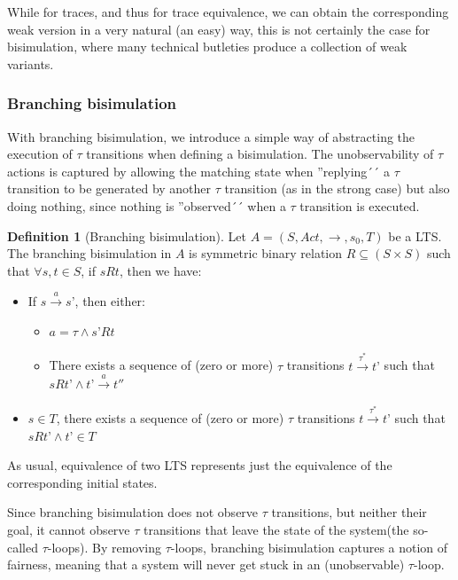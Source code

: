 \documentclass[11pt]{article}
\theoremstyle{definition}
\newtheorem{definition}{Definition}
\theoremstyle{plain}
\theoremstyle{definition}
\begin{document}
While for traces, and thus for trace equivalence, we can obtain the corresponding weak version in a very natural (an easy) way, this is not certainly the case for bisimulation, where many technical butleties produce a collection of weak variants.

\subsubsection{Branching bisimulation}
With branching bisimulation, we introduce a simple way of abstracting the execution of $ \tau $ transitions when defining a bisimulation. The unobservability of  $ \tau $ actions is captured by allowing the matching state when ''replying´´ a $ \tau $ transition to be generated by another $ \tau $ transition (as in the strong case) but also doing nothing, since nothing is ''observed´´ when a $ \tau $ transition is executed.

\begin{definition} [Branching bisimulation]
	Let $ A = (S, Act, \rightarrow, s_0, T) $ be a LTS. The branching bisimulation in $ A $ is symmetric binary relation $ R  \subseteq (S\times S) $ such that $\forall s, t \in S$, if $ s R t $, then we have:
	\begin{itemize}
		\item If $ s\xrightarrow{a}s’$, then either:
		\begin{itemize}
			\item $ a = \tau \wedge s’ R t $
			\item There exists a sequence of (zero or more) $ \tau $ transitions $ t\xrightarrow{\tau^*}t’ $ such that $ s R t’ \wedge t’\xrightarrow{a}t'' $
		\end{itemize}
		\item $ s \in T $, there exists a sequence of (zero or more) $ \tau $ transitions $ t\xrightarrow{\tau^*}t’ $ such that $ s R t’ \wedge t’ \in T $
	\end{itemize}
\end{definition}

As usual, equivalence of two LTS represents just the equivalence of the corresponding initial states.

Since branching bisimulation does not observe $ \tau $ transitions, but neither their goal, it cannot observe $ \tau $ transitions that leave the state of the system(the so-called $ \tau $-loops). By removing $ \tau $-loops, branching bisimulation captures a notion of fairness, meaning that a system will never get stuck in an (unobservable) $ \tau $-loop.
\end{document}
